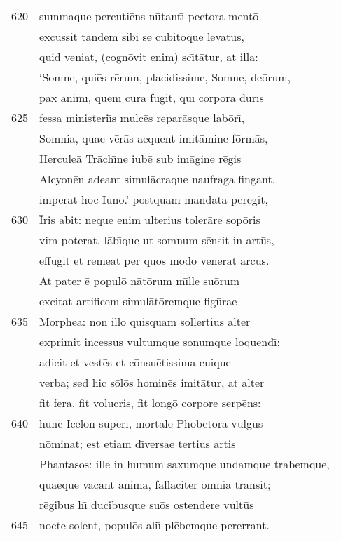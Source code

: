 \documentclass[paper=6in:9in,pagesize=pdftex,
               headinclude=on,footinclude=on,12pt]{scrbook}
\begin{document}
\begin{longtable}[p]{ r l }
620 & summaque percuti\=ens n\=utant\={\i} pectora ment\=o\\ 
 & excussit tandem sibi s\=e cubit\=oque lev\=atus,\\ 
 & quid veniat, (cogn\=ovit enim) sc\={\i}t\=atur, at illa:\\ 
 & `Somne, qui\=es r\=erum, placidissime, Somne, de\=orum,\\ 
 & p\=ax anim\={\i}, quem c\=ura fugit, qu\={\i} corpora d\=ur\={\i}s\\ 
625 & fessa ministeri\={\i}s mulc\=es repar\=asque lab\=or\={\i},\\ 
 & Somnia, quae v\=er\=as aequent imit\=amine f\=orm\=as,\\ 
 & Hercule\=a Tr\=ach\={\i}ne iub\=e sub im\=agine r\=egis\\ 
 & Alcyon\=en adeant simul\=acraque naufraga fingant.\\ 
 & imperat hoc I\=un\=o.' postquam mand\=ata per\=egit,\\ 
630 & \=Iris abit: neque enim ulterius toler\=are sop\=oris\\ 
 & vim poterat, l\=ab\={\i}que ut somnum s\=ensit in art\=us,\\ 
 & effugit et remeat per qu\=os modo v\=enerat arcus.\\ 
 & \indent At pater \=e popul\=o n\=at\=orum m\={\i}lle su\=orum\\ 
 & excitat artificem simul\=at\=oremque fig\=urae\\ 
635 & Morphea: n\=on ill\=o quisquam sollertius alter\\ 
 & exprimit incessus vultumque sonumque loquend\={\i};\\ 
 & adicit et vest\=es et c\=onsu\=etissima cuique\\ 
 & verba; sed hic s\=ol\=os homin\=es imit\=atur, at alter\\ 
 & fit fera, fit volucris, fit long\=o corpore serp\=ens:\\ 
640 & hunc Icelon super\={\i}, mort\=ale Phob\=etora vulgus\\ 
 & n\=ominat; est etiam d\={\i}versae tertius artis\\ 
 & Phantasos: ille in humum saxumque undamque trabemque,\\ 
 & quaeque vacant anim\=a, fall\=aciter omnia tr\=ansit;\\ 
 & r\=egibus h\={\i} ducibusque su\=os ostendere vult\=us\\ 
645 & nocte solent, popul\=os ali\={\i} pl\=ebemque pererrant.\\ 

\end{longtable}
\end{document}
